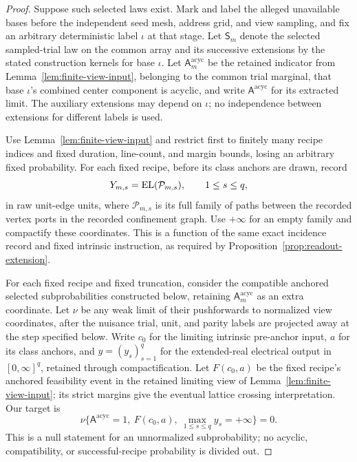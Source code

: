 \begin{proof}
Suppose such selected laws exist.  Mark and label the alleged unavailable
bases before the independent seed mesh, address grid, and view sampling,
and fix an arbitrary
deterministic label \(\iota\) at that stage.  Let \(\mathsf S_m\) denote
the selected sampled-trial law on the common array and its successive
extensions by the stated construction kernels for base \(\iota\).
Let \(\mathsf A_m^{\mathrm{acyc}}\) be the retained indicator from
Lemma~\ref{lem:finite-view-input}, belonging to the common trial marginal,
that base \(\iota\)'s combined center component is acyclic, and write
\(\mathsf A^{\mathrm{acyc}}\) for its extracted limit.  The auxiliary
extensions may depend on \(\iota\); no independence between extensions
for different labels is used.

Use Lemma~\ref{lem:finite-view-input} and restrict first to
finitely many recipe indices and fixed duration, line-count, and
margin bounds, losing an arbitrary fixed probability.  For each
fixed recipe, before its class anchors are drawn, record
\[
 Y_{m,s}=\operatorname{EL}(\mathcal P_{m,s}),\qquad 1\le s\le q,
\]
in raw unit-edge units, where \(\mathcal P_{m,s}\) is its full
family of paths between the recorded vertex ports in the
recorded confinement graph.  Use \(+\infty\) for an empty family
and compactify these coordinates.  This is a function of the
same exact incidence record and fixed intrinsic instruction,
as required by Proposition~\ref{prop:readout-extension}.

For each fixed recipe and fixed truncation, consider the compatible
anchored selected subprobabilities constructed below, retaining
\(\mathsf A_m^{\mathrm{acyc}}\) as an extra coordinate.  Let \(\nu\)
be any weak limit of their pushforwards to normalized view coordinates,
after the nuisance trial, unit, and parity labels are projected away
at the step specified below.  Write \(c_0\) for the limiting intrinsic
pre-anchor input, \(a\) for its class anchors, and \(y=(y_s)_{s=1}^q\)
for the extended-real electrical output in \([0,\infty]^q\), retained
through compactification.  Let \(F(c_0,a)\) be the
fixed recipe's anchored feasibility event in the retained limiting
view of Lemma~\ref{lem:finite-view-input}; its strict margins give
the eventual lattice crossing interpretation.  Our target is
\begin{equation}
\label{eq:selected-route-null}
 \nu\{\mathsf A^{\mathrm{acyc}}=1,\ F(c_0,a),\
       \max_{1\le s\le q}y_s=+\infty\}=0.
\end{equation}
This is a null statement for an unnormalized subprobability; no
acyclic, compatibility, or successful-recipe probability is divided out.


\end{proof}
